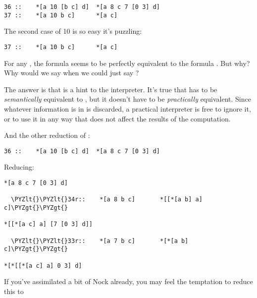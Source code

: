 \begin{framed_shaded}
\begin{Verbatim}[fontsize=\relsize{-2.5},commandchars=\\\{\}]
36 ::    *[a 10 [b c] d]  *[a 8 c 7 [0 3] d]
37 ::    *[a 10 b c]      *[a c]
\end{Verbatim}
\end{framed_shaded}
The second case of 10 is so easy it's puzzling:

\begin{framed_shaded}
\begin{Verbatim}[fontsize=\relsize{-2.5},commandchars=\\\{\}]
37 ::    *[a 10 b c]      *[a c]
\end{Verbatim}
\end{framed_shaded}
For any , the formula \kode{[10 b c]} seems to be perfectly
equivalent to the formula .  But why?  Why would we say
\kode{[10 b c]} when we could just say ?

The answer is that  is a hint to the interpreter.  It's true
that \kode{[10 b c]} has to be \emph{semantically} equivalent to , but
it doesn't have to be \emph{practically} equivalent.  Since whatever
information is in  is discarded, a practical interpreter is
free to ignore it, or to use it in any way that does not affect
the results of the computation.

And the other reduction of :

\begin{framed_shaded}
\begin{Verbatim}[fontsize=\relsize{-2.5},commandchars=\\\{\}]
    36 ::    *[a 10 [b c] d]  *[a 8 c 7 [0 3] d]
\end{Verbatim}
\end{framed_shaded}
Reducing:

\begin{framed_shaded}
\begin{Verbatim}[fontsize=\relsize{-2.5},commandchars=\\\{\}]
*[a 8 c 7 [0 3] d]

  \PYZlt{}\PYZlt{}34r::    *[a 8 b c]       *[[*[a b] a] c]\PYZgt{}\PYZgt{}

*[[*[a c] a] [7 [0 3] d]]

  \PYZlt{}\PYZlt{}33r::    *[a 7 b c]       *[*[a b] c]\PYZgt{}\PYZgt{}

*[*[[*[a c] a] 0 3] d]
\end{Verbatim}
\end{framed_shaded}
If you've assimilated a bit of Nock already, you may feel the
temptation to reduce this to

